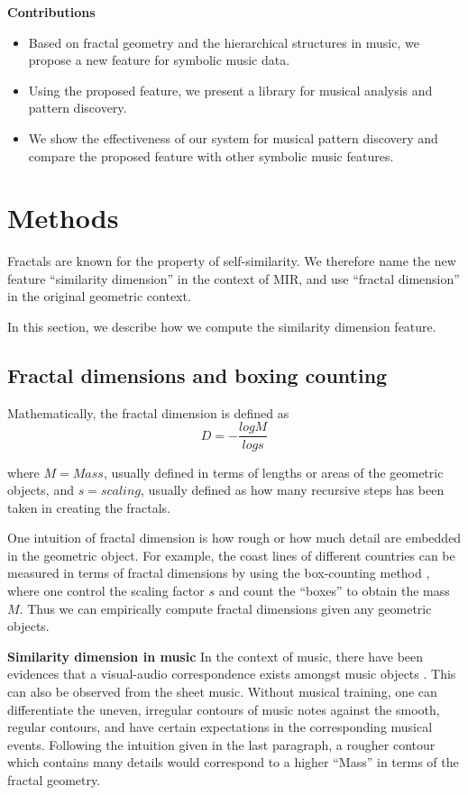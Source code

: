\textbf{Contributions}
\begin{itemize}
\item  Based on fractal geometry and the hierarchical structures in music, we propose a new feature for symbolic music data.
\item  Using the proposed feature, we present a library for musical analysis and pattern discovery.
\item  We show the effectiveness of our system for musical pattern discovery and compare the proposed feature with other symbolic music features. 
\end{itemize}

\section{Methods}
Fractals are known for the property of self-similarity.
We therefore name the new feature ``similarity dimension'' in the context of MIR, and use ``fractal dimension'' in the original geometric context.

In this section, we describe how we compute the similarity dimension feature.

\subsection{Fractal dimensions and boxing counting}
Mathematically, the fractal dimension is defined as $$D=-\frac{logM}{logs}$$

where $M=Mass$, usually defined in terms of lengths or areas of the geometric objects, and $s=scaling$, usually defined as how many recursive steps has been taken in creating the fractals.

One intuition of fractal dimension is how rough or how much detail are embedded in the geometric object.
For example, the coast lines of different countries can be measured in terms of fractal dimensions by using the box-counting method \cite{sarkar1994efficient}, where one control the scaling factor $s$ and count the ``boxes'' to obtain the mass $M$.
Thus we can empirically compute fractal dimensions given any geometric objects. 

\textbf{Similarity dimension in music}
In the context of music, there have been evidences that a visual-audio correspondence exists amongst music objects \cite{thorpe2016perception}.
This can also be observed from the sheet music.
Without musical training, one can differentiate the uneven, irregular contours of music notes against the smooth, regular contours, and have certain expectations in the corresponding musical events.
Following the intuition given in the last paragraph, a rougher contour which contains many details would correspond to a higher ``Mass'' in terms of the fractal geometry.

